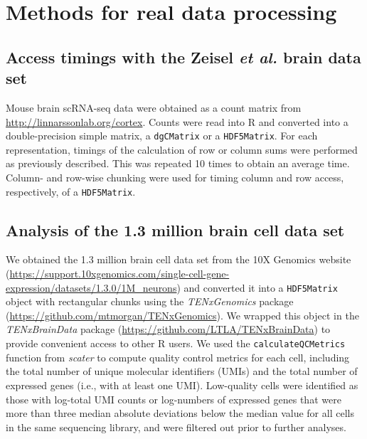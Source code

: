 \documentclass{article}
\newcommand{\code}[1]{\texttt{#1}}
\begin{document}
\section{Methods for real data processing}

\subsection{Access timings with the Zeisel \textit{et al.} brain data set}
Mouse brain scRNA-seq data \cite{zeisel2015brain} were obtained as a count matrix from \url{http://linnarssonlab.org/cortex}.
Counts were read into R and converted into a double-precision simple matrix, a \code{dgCMatrix} or a \code{HDF5Matrix}.
For each representation, timings of the calculation of row or column sums were performed as previously described.
This was repeated 10 times to obtain an average time.
Column- and row-wise chunking were used for timing column and row access, respectively, of a \code{HDF5Matrix}.

\subsection{Analysis of the 1.3 million brain cell data set}
We obtained the 1.3 million brain cell data set from the 10X Genomics website (\url{https://support.10xgenomics.com/single-cell-gene-expression/datasets/1.3.0/1M_neurons})
and converted it into a \code{HDF5Matrix} object with rectangular chunks using the \textit{TENxGenomics} package (\url{https://github.com/mtmorgan/TENxGenomics}).
We wrapped this object in the \textit{TENxBrainData} package (\url{https://github.com/LTLA/TENxBrainData}) to provide convenient access to other R users.
We used the \code{calculateQCMetrics} function from \textit{scater} \cite{mccarthy2017scater} to compute quality control metrics for each cell,
including the total number of unique molecular identifiers (UMIs) and the total number of expressed genes (i.e., with at least one UMI).
Low-quality cells were identified as those with log-total UMI counts or log-numbers of expressed genes that were more than three median absolute deviations below the median value for all cells in the same sequencing library, and were filtered out prior to further analyses.
\end{document}
